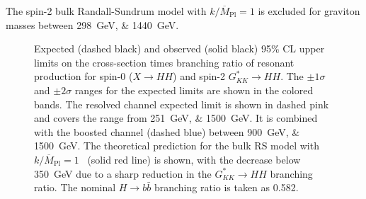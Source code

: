 The spin-2 bulk Randall-Sundrum model with $k/\overline{M}_{\mathrm{Pl}} = 1$ is excluded for 
graviton masses between \SIlist{298;1440}{\GeV}.
\begin{figure}[ht]
  \centering
  \vspace*{-3cm}

  \caption{\label{fig:res-limits}
    Expected (dashed black) and observed (solid black) 95\% CL upper limits on the cross-section times branching ratio of resonant production for spin-0 (\(X \rightarrow HH\)) and spin-2 \(G_{KK}^{*} \rightarrow HH\). 
    The \(\pm 1\sigma\) and \(\pm 2\sigma\) ranges for the expected limits are shown in the colored bands. 
    The resolved channel expected limit is shown in dashed pink and covers the range from \SIlist{251;1500}{\GeV}. 
    It is combined with the boosted channel (dashed blue) between \SIlist{900;1500}{\GeV}.
    The theoretical prediction for the bulk RS model with \(k/\overline{M}_{\mathrm{Pl}} = 1\)~\cite{Oliveira:2014kla} 
    (solid red line) is shown, with the decrease below \SI{350}{\GeV} due to a sharp reduction in the \(G_{KK}^{*} \rightarrow HH\) branching ratio. The nominal \(H \rightarrow b\bar{b}\) branching ratio is taken as 0.582.
  }
\end{figure}

